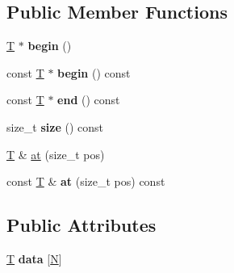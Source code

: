 \subsection*{Public Member Functions}
\begin{DoxyCompactItemize}
\item 
\mbox{\label{classfc_1_1array_3_01unsigned_01char_00_01_n_01_4_a786955a754f211b0fb9202e2a0426b8f}} 
\mbox{\hyperlink{struct_t}{T}} $\ast$ {\bfseries begin} ()
\item 
\mbox{\label{classfc_1_1array_3_01unsigned_01char_00_01_n_01_4_a9535febbda62142d0b89b660379d74e8}} 
const \mbox{\hyperlink{struct_t}{T}} $\ast$ {\bfseries begin} () const
\item 
\mbox{\label{classfc_1_1array_3_01unsigned_01char_00_01_n_01_4_a0134119ac950779bfaeea7a6edb34658}} 
const \mbox{\hyperlink{struct_t}{T}} $\ast$ {\bfseries end} () const
\item 
\mbox{\label{classfc_1_1array_3_01unsigned_01char_00_01_n_01_4_a203bf381773e553747da9ce99eacdc5b}} 
size\+\_\+t {\bfseries size} () const
\end{DoxyCompactItemize}
\textbf{ }\par
\begin{DoxyCompactItemize}
\item 
\mbox{\hyperlink{struct_t}{T}} \& \mbox{\hyperlink{classfc_1_1array_3_01unsigned_01char_00_01_n_01_4_ad86f8f8464a2c04c87fa1ea790e9f5db}{at}} (size\+\_\+t pos)
\item 
\mbox{\label{classfc_1_1array_3_01unsigned_01char_00_01_n_01_4_a8b2d6d006c33d7930da82d471264f344}} 
const \mbox{\hyperlink{struct_t}{T}} \& {\bfseries at} (size\+\_\+t pos) const
\end{DoxyCompactItemize}

\subsection*{Public Attributes}
\begin{DoxyCompactItemize}
\item 
\mbox{\label{classfc_1_1array_3_01unsigned_01char_00_01_n_01_4_adf7e58f0601f325817ec534ec0450f47}} 
\mbox{\hyperlink{struct_t}{T}} {\bfseries data} \mbox{[}\mbox{\hyperlink{group__types_gaf9c1edb0e0da55ec6ba09f32f6839529}{N}}\mbox{]}
\end{DoxyCompactItemize}


